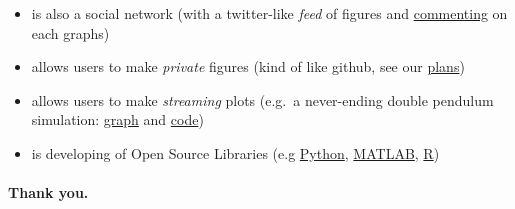 \documentclass{article}
\begin{document}
    \begin{itemize}
\itemsep1pt\parskip0pt
\item
  is also a social network (with a twitter-like \emph{feed} of figures
  and \href{https://plot.ly/~etpinard/25}{commenting} on each graphs)
\item
  allows users to make \emph{private} figures (kind of like github, see
  our \href{https://plot.ly/plans}{plans})
\item
  allows users to make \emph{streaming} plots (e.g.~a never-ending
  double pendulum simulation:
  \href{https://plot.ly/~streaming-demos/4}{graph} and
  \href{http://nbviewer.ipython.org/github/plotly/python-user-guide/blob/master/s7_streaming/s7_streaming_p2-double-pendulum.ipynb}{code})
\item
  is developing of Open Source Libraries (e.g
  \href{https://github.com/plotly/python-api}{Python},
  \href{https://github.com/plotly/matlab-api}{MATLAB},
  \href{https://github.com/ropensci/plotly}{R})
\end{itemize}


    \paragraph{Thank you.}



    
    
    
    
\end{document}
